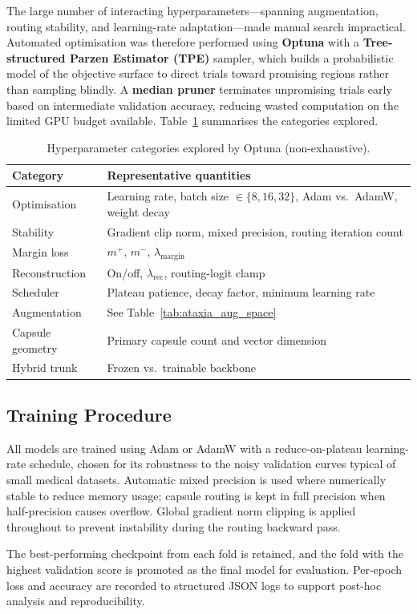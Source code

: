 The large number of interacting hyperparameters---spanning augmentation, routing stability, and learning-rate adaptation---made manual search impractical. Automated optimisation was therefore performed using \textbf{Optuna} with a \textbf{Tree-structured Parzen Estimator (TPE)} sampler, which builds a probabilistic model of the objective surface to direct trials toward promising regions rather than sampling blindly. A \textbf{median pruner} terminates unpromising trials early based on intermediate validation accuracy, reducing wasted computation on the limited GPU budget available. Table~\ref{tab:optuna_space_snapshot} summarises the categories explored.

\begin{table}[htbp]
  \centering
  \caption{Hyperparameter categories explored by Optuna (non-exhaustive).}
  \label{tab:optuna_space_snapshot}
  \small
  \begin{tabular}{ll}
    \toprule
    \textbf{Category} & \textbf{Representative quantities} \\
    \midrule
    Optimisation      & Learning rate, batch size $\in\{8,16,32\}$, Adam vs.\ AdamW, weight decay \\
    Stability         & Gradient clip norm, mixed precision, routing iteration count \\
    Margin loss       & $m^{+}$, $m^{-}$, $\lambda_{\mathrm{margin}}$ \\
    Reconstruction    & On/off, $\lambda_{\mathrm{rec}}$, routing-logit clamp \\
    Scheduler         & Plateau patience, decay factor, minimum learning rate \\
    Augmentation      & See Table~\ref{tab:ataxia_aug_space} \\
    Capsule geometry  & Primary capsule count and vector dimension \\
    Hybrid trunk      & Frozen vs.\ trainable backbone \\
    \bottomrule
  \end{tabular}
\end{table}

\subsection{Training Procedure}
\label{subsec:ataxia_training}

All models are trained using Adam or AdamW with a reduce-on-plateau learning-rate schedule, chosen for its robustness to the noisy validation curves typical of small medical datasets. Automatic mixed precision is used where numerically stable to reduce memory usage; capsule routing is kept in full precision when half-precision causes overflow. Global gradient norm clipping is applied throughout to prevent instability during the routing backward pass.

The best-performing checkpoint from each fold is retained, and the fold with the highest validation score is promoted as the final model for evaluation. Per-epoch loss and accuracy are recorded to structured JSON logs to support post-hoc analysis and reproducibility.